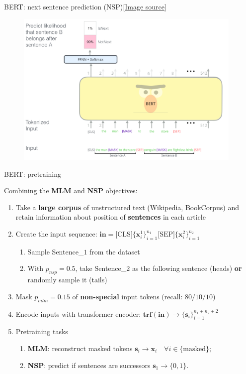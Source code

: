 \documentclass[12pt,aspectratio=169,handout]{beamer}
\begin{document}
\begin{frame}{BERT: next sentence prediction (NSP)\href{http://jalammar.github.io/illustrated-bert/}{[\underline{Image source}]}}

	\begin{figure}[h]
		\includegraphics[height=7.5cm]{bert-next-sentence-prediction.png}
	\end{figure}

\end{frame}

\begin{frame}{BERT: pretraining}

Combining the \textbf{MLM} and \textbf{NSP} objectives:

\begin{enumerate}
	\item Take a \textbf{large corpus} of unstructured text (Wikipedia, BookCorpus) and retain information about position of \textbf{sentences} in each article
	\pause
	\item Create the input sequence: $\mathbf{in} = \text{[CLS]} \{\bm{x}^1_{i}\}_{i=1}^{n_1} \text{[SEP]} \{\bm{x}^2_{i}\}_{i=1}^{n_2}$
	\pause
	\begin{enumerate}
	\item Sample Sentence\_$1$ from the dataset
	\pause
	\item With $p_{nsp} = 0.5$, take Sentence\_$2$ as the following sentence (heads) \textbf{or} randomly sample it (tails) 
	\end{enumerate}
	\pause
	\item Mask $p_{mlm}=0.15$ of \textbf{non-special} input tokens (recall: $80/10/10$)
	\pause
	\item Encode inputs with transformer encoder: $ \mathbf{trf}(\mathbf{in}) \to \{ \bm{s}_{i}\}_{i=1}^{n_1 + n_2 + 2} $
	\pause
	\item Pretraining tasks
	\begin{enumerate}
	\item \textbf{MLM}: reconstruct masked tokens $\bm{s}_i \to \bm{x}_i \quad \forall i \in  \{\text{masked}\}$;
	\item \textbf{NSP}: predict if sentences are successors $\bm{s}_1 \to \{0,1\}$.
	\end{enumerate}
\end{enumerate}

\end{frame}
	
\end{document}
